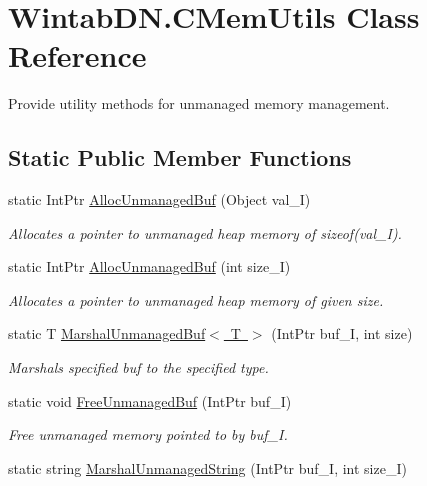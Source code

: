 \hypertarget{class_wintab_d_n_1_1_c_mem_utils}{}\section{Wintab\+D\+N.\+C\+Mem\+Utils Class Reference}
\label{class_wintab_d_n_1_1_c_mem_utils}


Provide utility methods for unmanaged memory management.  


\subsection*{Static Public Member Functions}
\begin{DoxyCompactItemize}
\item 
static Int\+Ptr \mbox{\hyperlink{class_wintab_d_n_1_1_c_mem_utils_aa4382dd752e905681edcada831541acf}{Alloc\+Unmanaged\+Buf}} (Object val\+\_\+I)
\begin{DoxyCompactList}\small\item\em Allocates a pointer to unmanaged heap memory of sizeof(val\+\_\+\+I). \end{DoxyCompactList}\item 
static Int\+Ptr \mbox{\hyperlink{class_wintab_d_n_1_1_c_mem_utils_a040095d5e15e45e5e9c5c319a3acbd04}{Alloc\+Unmanaged\+Buf}} (int size\+\_\+I)
\begin{DoxyCompactList}\small\item\em Allocates a pointer to unmanaged heap memory of given size. \end{DoxyCompactList}\item 
static T \mbox{\hyperlink{class_wintab_d_n_1_1_c_mem_utils_a1de9ef858542278844e26f8fb4963e02}{Marshal\+Unmanaged\+Buf$<$ T $>$}} (Int\+Ptr buf\+\_\+I, int size)
\begin{DoxyCompactList}\small\item\em Marshals specified buf to the specified type. \end{DoxyCompactList}\item 
static void \mbox{\hyperlink{class_wintab_d_n_1_1_c_mem_utils_a6a1fcfba4ce4ed260a86d87f80eac0d1}{Free\+Unmanaged\+Buf}} (Int\+Ptr buf\+\_\+I)
\begin{DoxyCompactList}\small\item\em Free unmanaged memory pointed to by buf\+\_\+I. \end{DoxyCompactList}\item 
static string \mbox{\hyperlink{class_wintab_d_n_1_1_c_mem_utils_a6d38c832a884e4bc72ec906d7be29c1f}{Marshal\+Unmanaged\+String}} (Int\+Ptr buf\+\_\+I, int size\+\_\+I)

\end{DoxyCompactItemize}

